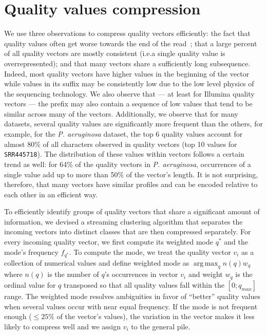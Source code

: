 \documentclass[12pt]{cmuthesis}
\DeclareMathOperator*{\argmax}{arg\,max}
\begin{document}
\section{Quality values compression}

  We use three observations to compress quality vectors efficiently: the fact that quality values often get worse towards the end of the read~\cite{SeqSqueeze}; that a large percent of all quality vectors are mostly consistent (i.e.\@ a single quality value is overrepresented); and that many vectors share a sufficiently long subsequence. Indeed, most quality vectors have higher values in the beginning of the vector while values in its suffix may be consistently low due to the low level physics of the sequencing technology. We also observe that --- at least for Illumina quality vectors --- the prefix may also contain a sequence of low values that tend to be similar across many of the vectors.  Additionally, we observe that for many datasets, several quality values are significantly more frequent than the others, for example, for the \textit{P. aeruginosa} dataset, the top 6 quality values account for almost 80\% of all characters observed in quality vectors (top 10 values for \texttt{SRR445718}). The distribution of these values within vectors follows a certain trend as well: for 64\% of the quality vectors in \textit{P. aeruginosa}, occurrences of a single value add up to more than 50\% of the vector's length. It is not surprising, therefore, that many vectors have similar profiles and can be encoded relative to each other in an efficient way.



  To efficiently identify groups of quality vectors that share a significant amount of information, we devised a streaming clustering algorithm that separates the incoming vectors into distinct classes that are then compressed separately. For every incoming quality vector, we first compute its weighted mode $q^{*}$ and the mode's frequency $f_{q^{*}}$. To compute the mode, we treat the quality vector $v_i$ as a collection of numerical values and define weighted mode as $\argmax_q n(q) w_q$ where $n(q)$ is the number of $q$'s occurrences in vector $v_i$ and weight $w_q$ is the ordinal value for $q$ transposed so that all quality values fall within the $[0;q_{max}]$ range. The weighted mode resolves ambiguities in favor of ``better'' quality values when several values occur with near equal frequency. If the mode is not frequent enough ($\le 25\%$ of the vector's values), the variation in the vector makes it less likely to compress well and we assign $v_i$ to the general pile.
\end{document}
